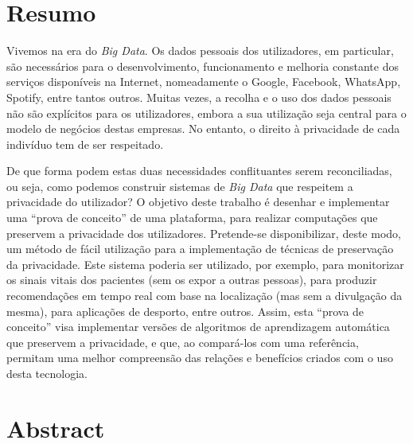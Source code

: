 %

\chapter*{Resumo} %
\thispagestyle{empty}

Vivemos na era do \textit{Big Data}. Os dados pessoais dos utilizadores, em particular, s\~{a}o necess\'{a}rios para o desenvolvimento, funcionamento e melhoria constante dos servi\c{c}os dispon\'{i}veis na Internet, nomeadamente o Google, Facebook, WhatsApp, Spotify, entre tantos outros. Muitas vezes, a recolha e o uso dos dados pessoais n\~{a}o s\~{a}o expl\'{i}citos para os utilizadores, embora a sua utiliza\c{c}\~{a}o seja central para o modelo de neg\'{o}cios destas empresas. No entanto, o direito \`{a} privacidade de cada indiv\'{i}duo tem de ser respeitado.

De que forma podem estas duas necessidades conflituantes serem reconciliadas, ou seja, como podemos construir sistemas de \textit{Big Data} que respeitem a privacidade do utilizador? O objetivo deste trabalho \'{e} desenhar e implementar uma ``prova de conceito'' de uma plataforma, para realizar computa\c{c}ões que preservem a privacidade dos utilizadores. Pretende-se disponibilizar, deste modo, um m\'{e}todo de f\'{a}cil utiliza\c{c}\~{a}o para a implementa\c{c}\~{a}o de t\'{e}cnicas de preserva\c{c}\~{a}o da privacidade. Este sistema poderia ser utilizado, por exemplo, para monitorizar os sinais vitais dos pacientes (sem os expor a outras pessoas), para produzir recomenda\c{c}ões em tempo real com base na localiza\c{c}\~{a}o (mas sem a divulga\c{c}\~{a}o da mesma), para aplica\c{c}ões de desporto, entre outros. Assim, esta ``prova de conceito'' visa implementar versões de algoritmos de aprendizagem autom\'{a}tica que preservem a privacidade, e que, ao compar\'{a}-los com uma refer\^{e}ncia, permitam uma melhor compreens\~{a}o das rela\c{c}ões e benef\'{i}cios criados com o uso desta tecnologia.


\newpage

\chapter*{Abstract} %
\thispagestyle{empty}

